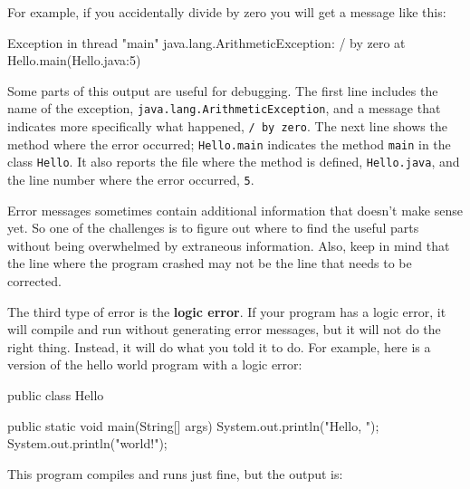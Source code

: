 \documentclass[12pt]{book}
\makeatletter
\theoremstyle{exercise}
\newcommand{\java}[1]{\verb"#1"}
\renewcommand\subsection{\@startsection{subsection}{2}{\z@}%
    {-3.25ex\@plus -1ex \@minus -.2ex}%
    {0.3ex \@plus .2ex}%
    {\normalfont\large\bfseries}}
\newcommand{\java}[1]{\lstinline{#1}} %
\makeatother
\begin{document}
For example, if you accidentally divide by zero you will get a message like this:

\begin{small}
\begin{stdout}
Exception in thread "main" java.lang.ArithmeticException: / by zero
    at Hello.main(Hello.java:5)
\end{stdout}
\end{small}


Some parts of this output are useful for debugging.
The first line includes the name of the exception, \java{java.lang.ArithmeticException}, and a message that indicates more specifically what happened, \java{/ by zero}.
The next line shows the method where the error occurred; \java{Hello.main} indicates the method \java{main} in the class \java{Hello}.
It also reports the file where the method is defined, \java{Hello.java}, and the line number where the error occurred, \java{5}.

Error messages sometimes contain additional information that doesn't make sense yet.
So one of the challenges is to figure out where to find the useful parts without being overwhelmed by extraneous information.
Also, keep in mind that the line where the program crashed may not be the line that needs to be corrected.



The third type of error is the {\bf logic error}.
If your program has a logic error, it will compile and run without generating error messages, but it will not do the right thing.
Instead, it will do what you told it to do.
For example, here is a version of the hello world program with a logic error:

\begin{code}
public class Hello {

    public static void main(String[] args) {
        System.out.println("Hello, ");
        System.out.println("world!");
    }
}
\end{code}

This program compiles and runs just fine, but the output is:
\end{document}
